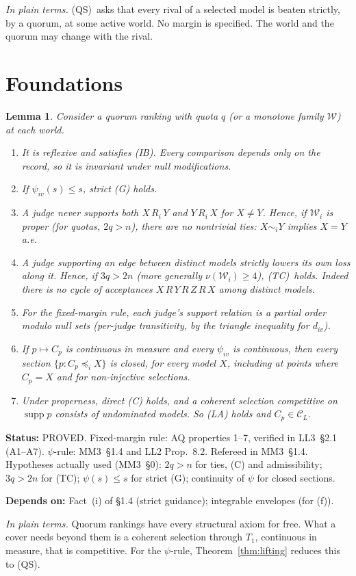 \documentclass[11pt]{article}
\newtheorem{lemma}[theorem]{Lemma}
\theoremstyle{definition}
\theoremstyle{remark}
\newcommand{\C}{\mathcal C}
\newcommand{\W}{\mathcal W}
\newcommand{\supp}{\operatorname{supp}}
\newcommand{\src}[1]{\textsf{#1}}
\newcommand{\status}[1]{\par\smallskip\noindent\textbf{Status:} #1\par}
\newcommand{\deps}[1]{\noindent\textbf{Depends on:} #1\par}
\newcommand{\inwords}[1]{\noindent\textit{In plain terms.} #1\par\smallskip}
\newcommand{\QS}{\textup{(QS)}}
\newcommand{\TC}{\textup{(TC)}}
\begin{document}
\inwords{\QS\ asks that every rival of a selected model is beaten strictly, by a quorum, at some active world. No margin is specified. The world and the quorum may change with the rival.}

\section{Foundations}\label{sec:foundations}

\begin{lemma}\label{lem:elementary}
Consider a quorum ranking with quota $q$ (or a monotone family $\W$) at each world.
\begin{enumerate}[label=(\alph*)]
\item It is reflexive and satisfies (IB). Every comparison depends only on the record, so it is invariant under null modifications.
\item If $\psi_{iv}(s)\le s$, strict (G) holds.
\item A judge never supports both $X\,R_i\,Y$ and $Y\,R_i\,X$ for $X\ne Y$. Hence, if $\W_i$ is proper (for quotas, $2q>n$), there are no nontrivial ties: $X\sim_iY$ implies $X=Y$ a.e.
\item A judge supporting an edge between distinct models strictly lowers its own loss along it. Hence, if $3q>2n$ (more generally $\nu(\W_i)\ge4$), \TC\ holds. Indeed there is no cycle of acceptances $X\,R\,Y\,R\,Z\,R\,X$ among distinct models.
\item For the fixed-margin rule, each judge's support relation is a partial order modulo null sets (per-judge transitivity, by the triangle inequality for $d_{iv}$).
\item If $p\mapsto C_p$ is continuous in measure and every $\psi_{iv}$ is continuous, then every section $\{p:C_p\preceq_iX\}$ is closed, for every model $X$, including at points where $C_p=X$ and for non-injective selections.
\item Under properness, direct (C) holds, and a coherent selection competitive on $\supp p$ consists of undominated models. So (LA) holds and $C_p\in\C_L$.
\end{enumerate}
\end{lemma}
\status{PROVED. Fixed-margin rule: \src{AQ} properties 1--7, verified in \src{LL3}~\S2.1 (A1--A7). $\psi$-rule: \src{MM3}~\S1.4 and \src{LL2} Prop.~8.2. Refereed in \src{MM3}~\S1.4. Hypotheses actually used (\src{MM3}~\S0): $2q>n$ for ties, (C) and admissibility; $3q>2n$ for \TC; $\psi(s)\le s$ for strict (G); continuity of $\psi$ for closed sections.}
\deps{Fact~(i) of \S1.4 (strict guidance); integrable envelopes (for (f)).}
\inwords{Quorum rankings have every structural axiom for free. What a cover needs beyond them is a coherent selection through $T_1$, continuous in measure, that is competitive. For the $\psi$-rule, Theorem~\ref{thm:lifting} reduces this to \QS.}
\end{document}
